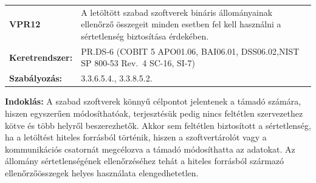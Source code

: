 \documentclass[12pt,magyar,a4paper,oneside]{scrreprt}
\begin{document}
\begin{longtable}[]{@{}ll@{}}
\toprule
\endhead
\begin{minipage}[t]{0.16\columnwidth}\raggedright
\textbf{VPR12}\strut
\end{minipage} & \begin{minipage}[t]{0.79\columnwidth}\raggedright
A letöltött szabad szoftverek bináris állományainak ellenőrző összegeit
minden esetben fel kell használni a sértetlenség biztosítása
érdekében.\strut
\end{minipage}\tabularnewline
\begin{minipage}[t]{0.16\columnwidth}\raggedright
\textbf{Keretrendszer:}\strut
\end{minipage} & \begin{minipage}[t]{0.79\columnwidth}\raggedright
PR.DS-6 (COBIT 5 APO01.06, BAI06.01, DSS06.02,NIST SP 800-53 Rev.~4
SC-16, SI-7)\strut
\end{minipage}\tabularnewline
\begin{minipage}[t]{0.16\columnwidth}\raggedright
\textbf{Szabályozás:}\strut
\end{minipage} & \begin{minipage}[t]{0.79\columnwidth}\raggedright
3.3.6.5.4., 3.3.8.5.2.\strut
\end{minipage}\tabularnewline
\bottomrule
\end{longtable}

\textbf{Indoklás: } A szabad szoftverek könnyű célpontot jelentenek a
támadó számára, hiszen egyszerűen módosíthatóak, terjesztésük pedig
nincs feltétlen szervezethez kötve és több helyről beszerezhetők. Akkor
sem feltétlen biztosított a sértetlenség, ha a letöltést hiteles
forrásból történik, hiszen a szoftvertárolót vagy a kommunikációs
csatornát megcélozva a támadó módosíthatta az adatokat. Az állomány
sértetlenségének ellenőrzéséhez tehát a hiteles forrásból származó
ellenőrzőösszegek helyes használata elengedhetetlen.
\end{document}
